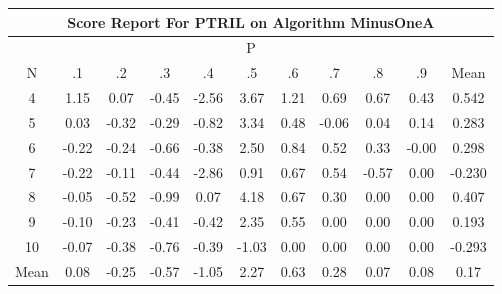 \documentclass[11pt,a4paper]{report}
\begin{document}
\begin{longtable}{ | c || c | c | c | c | c | c | c | c | c || c |}
\hline
\multicolumn{11}{|c|}{ Score Report For PTRIL on Algorithm MinusOneA} \\
\hline
\multicolumn{11}{|c|}{ P } \\
\hline
N & .1 & .2 & .3 & .4 & .5 & .6 & .7 & .8 & .9 & Mean\\
 \hline
 \hline
 \endhead
  4 &  \cellcolor[HTML]{DFDFFF} 1.15 &  \cellcolor[HTML]{FFFFFF} 0.07 &  \cellcolor[HTML]{FFF7F7} -0.45 &  \cellcolor[HTML]{FFBFBF} -2.56 &  \cellcolor[HTML]{9F9FFF} 3.67 &  \cellcolor[HTML]{DFDFFF} 1.21 &  \cellcolor[HTML]{EFEFFF} 0.69 &  \cellcolor[HTML]{EFEFFF} 0.67 &  \cellcolor[HTML]{F7F7FF} 0.43 & 0.542 \\
  5 &  \cellcolor[HTML]{FFFFFF} 0.03 &  \cellcolor[HTML]{FFF7F7} -0.32 &  \cellcolor[HTML]{FFF7F7} -0.29 &  \cellcolor[HTML]{FFE7E7} -0.82 &  \cellcolor[HTML]{A7A7FF} 3.34 &  \cellcolor[HTML]{EFEFFF} 0.48 &  \cellcolor[HTML]{FFFFFF} -0.06 &  \cellcolor[HTML]{FFFFFF} 0.04 &  \cellcolor[HTML]{FFFFFF} 0.14 & 0.283 \\
  6 &  \cellcolor[HTML]{FFF7F7} -0.22 &  \cellcolor[HTML]{FFF7F7} -0.24 &  \cellcolor[HTML]{FFEFEF} -0.66 &  \cellcolor[HTML]{FFF7F7} -0.38 &  \cellcolor[HTML]{BFBFFF} 2.50 &  \cellcolor[HTML]{E7E7FF} 0.84 &  \cellcolor[HTML]{EFEFFF} 0.52 &  \cellcolor[HTML]{F7F7FF} 0.33 &  \cellcolor[HTML]{FFFFFF} -0.00 & 0.298 \\
  7 &  \cellcolor[HTML]{FFF7F7} -0.22 &  \cellcolor[HTML]{FFFFFF} -0.11 &  \cellcolor[HTML]{FFF7F7} -0.44 &  \cellcolor[HTML]{FFB7B7} -2.86 &  \cellcolor[HTML]{E7E7FF} 0.91 &  \cellcolor[HTML]{EFEFFF} 0.67 &  \cellcolor[HTML]{EFEFFF} 0.54 &  \cellcolor[HTML]{FFEFEF} -0.57 &  \cellcolor[HTML]{FFFFFF} 0.00 & -0.230 \\
  8 &  \cellcolor[HTML]{FFFFFF} -0.05 &  \cellcolor[HTML]{FFEFEF} -0.52 &  \cellcolor[HTML]{FFE7E7} -0.99 &  \cellcolor[HTML]{FFFFFF} 0.07 &  \cellcolor[HTML]{9797FF} 4.18 &  \cellcolor[HTML]{EFEFFF} 0.67 &  \cellcolor[HTML]{F7F7FF} 0.30 &  \cellcolor[HTML]{FFFFFF} 0.00 &  \cellcolor[HTML]{FFFFFF} 0.00 & 0.407 \\
  9 &  \cellcolor[HTML]{FFFFFF} -0.10 &  \cellcolor[HTML]{FFF7F7} -0.23 &  \cellcolor[HTML]{FFF7F7} -0.41 &  \cellcolor[HTML]{FFF7F7} -0.42 &  \cellcolor[HTML]{C7C7FF} 2.35 &  \cellcolor[HTML]{EFEFFF} 0.55 &  \cellcolor[HTML]{FFFFFF} 0.00 &  \cellcolor[HTML]{FFFFFF} 0.00 &  \cellcolor[HTML]{FFFFFF} 0.00 & 0.193 \\
  10 &  \cellcolor[HTML]{FFFFFF} -0.07 &  \cellcolor[HTML]{FFF7F7} -0.38 &  \cellcolor[HTML]{FFEFEF} -0.76 &  \cellcolor[HTML]{FFF7F7} -0.39 &  \cellcolor[HTML]{FFE7E7} -1.03 &  \cellcolor[HTML]{FFFFFF} 0.00 &  \cellcolor[HTML]{FFFFFF} 0.00 &  \cellcolor[HTML]{FFFFFF} 0.00 &  \cellcolor[HTML]{FFFFFF} 0.00 & -0.293 \\
 \hline
 \hline
Mean &  \cellcolor[HTML]{FFFFFF} 0.08 &  \cellcolor[HTML]{FFF7F7} -0.25 &  \cellcolor[HTML]{FFEFEF} -0.57 &  \cellcolor[HTML]{FFE7E7} -1.05 &  \cellcolor[HTML]{C7C7FF} 2.27 &  \cellcolor[HTML]{EFEFFF} 0.63 &  \cellcolor[HTML]{F7F7FF} 0.28 &  \cellcolor[HTML]{FFFFFF} 0.07 &  \cellcolor[HTML]{FFFFFF} 0.08 &  \cellcolor[HTML]{F7F7FF} 0.17
\end{longtable}
\end{document}
